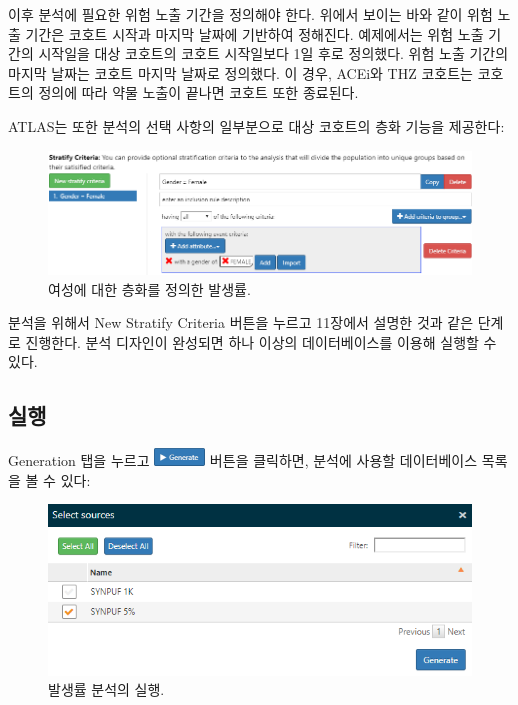 \documentclass[10.5pt]{book}
\theoremstyle{definition}
\theoremstyle{definition}
\theoremstyle{definition}
\theoremstyle{remark}
\begin{document}
이후 분석에 필요한 위험 노출 기간을 정의해야 한다. 위에서 보이는 바와
같이 위험 노출 기간은 코호트 시작과 마지막 날짜에 기반하여 정해진다.
예제에서는 위험 노출 기간의 시작일을 대상 코호트의 코호트 시작일보다 1일
후로 정의했다. 위험 노출 기간의 마지막 날짜는 코호트 마지막 날짜로
정의했다. 이 경우, ACEi와 THZ 코호트는 코호트의 정의에 따라 약물 노출이
끝나면 코호트 또한 종료된다.

ATLAS는 또한 분석의 선택 사항의 일부분으로 대상 코호트의 층화 기능을
제공한다:

\begin{figure}

{\centering \includegraphics[width=1\linewidth]{images/Characterization/atlasIncidenceStratifyFemale} 

}

\caption{여성에 대한 층화를 정의한 발생률.}\label{fig:atlasIncidenceStratifyFemale}
\end{figure}

분석을 위해서 New Stratify Criteria 버튼을 누르고 11장에서 설명한 것과
같은 단계로 진행한다. 분석 디자인이 완성되면 하나 이상의 데이터베이스를
이용해 실행할 수 있다.

\subsection{실행}\label{-1}

Generation 탭을 누르고
\includegraphics{images/Characterization/atlasIncidenceGenerate.png}
버튼을 클릭하면, 분석에 사용할 데이터베이스 목록을 볼 수 있다:

\begin{figure}

{\centering \includegraphics[width=1\linewidth]{images/Characterization/atlasIncidenceSourceSelection} 

}

\caption{발생률 분석의 실행.}\label{fig:atlasIncidenceSourceSelection}
\end{figure}
\end{document}
